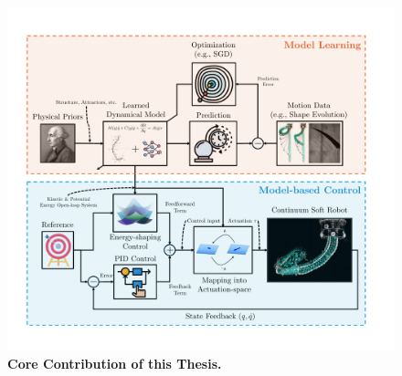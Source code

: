 \begin{figure}[ht]
    \centering
    \includegraphics[width=0.9\linewidth]{introduction/figures/model_based_control_with_learned_models_v2_cropped.pdf}
    \caption{\textbf{Core Contribution of this Thesis.} 
}
\end{figure}
